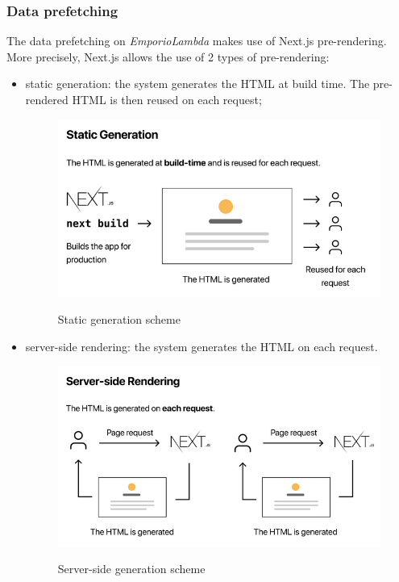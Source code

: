 \subsubsection{Data prefetching}
The data prefetching on \textit{EmporioLambda} makes use of Next.js pre-rendering.\\
More precisely, Next.js allows the use of 2 types of pre-rendering:
\begin{itemize}
\item static generation: the system generates the HTML at build time. The pre-rendered HTML is then reused on each request;
\begin{figure}[H]
\centering
\includegraphics[scale=0.70]{res/Architettura/Frontend/img/staticGeneration}\\
\caption{Static generation scheme}
\end{figure}
\vspace{0.7cm}
\item server-side rendering: the system generates the HTML on each request.
\begin{figure}[H]
\centering
\includegraphics[scale=0.70]{res/Architettura/Frontend/img/serverSideRendering}\\
\caption{Server-side generation scheme}
\end{figure}
\vspace{0.7cm}
\end{itemize}
